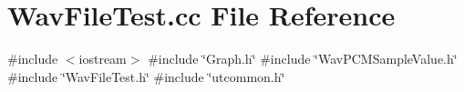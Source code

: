 \section{Wav\+File\+Test.\+cc File Reference}
\label{WavFileTest_8cc}
{\ttfamily \#include $<$iostream$>$}\newline
{\ttfamily \#include \char`\"{}Graph.\+h\char`\"{}}\newline
{\ttfamily \#include \char`\"{}Wav\+P\+C\+M\+Sample\+Value.\+h\char`\"{}}\newline
{\ttfamily \#include \char`\"{}Wav\+File\+Test.\+h\char`\"{}}\newline
{\ttfamily \#include \char`\"{}utcommon.\+h\char`\"{}}\newline
